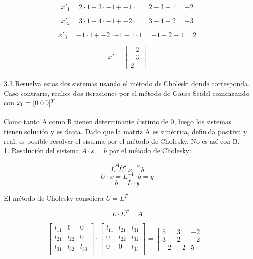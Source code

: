 \documentclass{article}
\begin{document}
\[
x'_1 = 2 \cdot 1 + 3 \cdot -1 + -1 \cdot 1 = 2 -3 - 1 = -2 
\]

\[
x'_2 = 3 \cdot 1 + 4 \cdot -1 + -2 \cdot 1 = 3 - 4 - 2 = -3 
\]

\[
x'_3 = -1 \cdot 1 + -2 \cdot -1 + 1 \cdot 1 = -1 + 2 + 1 = 2 
\]

\[
x' =
\begin{bmatrix}
    -2 \\ -3 \\ 2
\end{bmatrix} 
\]\\
 
3.3 Resuelva estos dos sistemas usando el método de Choleski donde corresponda. Caso
contrario, realice dos iteraciones por el método de Gauss Seidel comenzando con
$x_0 = [0 \hspace{0.1cm} 0 \hspace{0.1cm} 0]^{T}$ \\\\
Como tanto A como B tienen determinante distinto de 0, luego los sistemas tienen solución y es única.
Dado que la matriz A es simétrica, definida positiva y real, es posible resolver el sistema por el método de Cholesky. No es así con B.\\

1. Resolución del sistema $A \cdot x = b$ por el método de Cholesky:

\[
A \cdot x = b
\]
\[
L \cdot U \cdot x = b
\]
\[
U \cdot x = L^{-1} \cdot b = y
\]
\[
b = L \cdot y
\]

El método de Cholesky consdiera $U = L^T$ 

\[
L \cdot L^T = A
\]

\[
\begin{bmatrix}
l_{11} & 0 & 0 \\
l_{21} & l_{22} & 0 \\
l_{31} & l_{32} & l_{33} \\
\end{bmatrix} 
\cdot
\begin{bmatrix}
l_{11} & l_{21} & l_{31} \\
0 & l_{22} & l_{32} \\
0 & 0 & l_{33} \\
\end{bmatrix} 
=
\begin{bmatrix}
5 & 3 & -2 \\
3 & 2 & -2 \\
-2 & -2 & 5 
\end{bmatrix} 
\]
\end{document}
